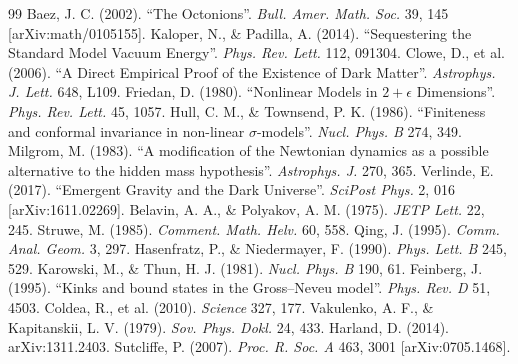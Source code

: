 \documentclass[a4paper,12pt]{article}
\begin{document}




\begin{thebibliography}{99}
 Baez, J. C. (2002). ``The Octonions''. \textit{Bull. Amer. Math. Soc.} 39, 145 [arXiv:math/0105155].
 Kaloper, N., \& Padilla, A. (2014). ``Sequestering the Standard Model Vacuum Energy''. \textit{Phys. Rev. Lett.} 112, 091304.
 Clowe, D., et al. (2006). ``A Direct Empirical Proof of the Existence of Dark Matter''. \textit{Astrophys. J. Lett.} 648, L109.
 Friedan, D. (1980). ``Nonlinear Models in $2+\epsilon$ Dimensions''. \textit{Phys. Rev. Lett.} 45, 1057.
 Hull, C. M., \& Townsend, P. K. (1986). ``Finiteness and conformal invariance in non-linear $\sigma$-models''. \textit{Nucl. Phys. B} 274, 349.
 Milgrom, M. (1983). ``A modification of the Newtonian dynamics as a possible alternative to the hidden mass hypothesis''. \textit{Astrophys. J.} 270, 365.
 Verlinde, E. (2017). ``Emergent Gravity and the Dark Universe''. \textit{SciPost Phys.} 2, 016 [arXiv:1611.02269].
 Belavin, A. A., \& Polyakov, A. M. (1975). \textit{JETP Lett.} 22, 245.
 Struwe, M. (1985). \textit{Comment. Math. Helv.} 60, 558.
 Qing, J. (1995). \textit{Comm. Anal. Geom.} 3, 297.
 Hasenfratz, P., \& Niedermayer, F. (1990). \textit{Phys. Lett. B} 245, 529.
 Karowski, M., \& Thun, H. J. (1981). \textit{Nucl. Phys. B} 190, 61.
 Feinberg, J. (1995). ``Kinks and bound states in the Gross--Neveu model''. \textit{Phys. Rev. D} 51, 4503.
 Coldea, R., et al. (2010). \textit{Science} 327, 177.
 Vakulenko, A. F., \& Kapitanskii, L. V. (1979). \textit{Sov. Phys. Dokl.} 24, 433.
 Harland, D. (2014). arXiv:1311.2403.
 Sutcliffe, P. (2007). \textit{Proc. R. Soc. A} 463, 3001 [arXiv:0705.1468].


\end{thebibliography}
\end{document}
